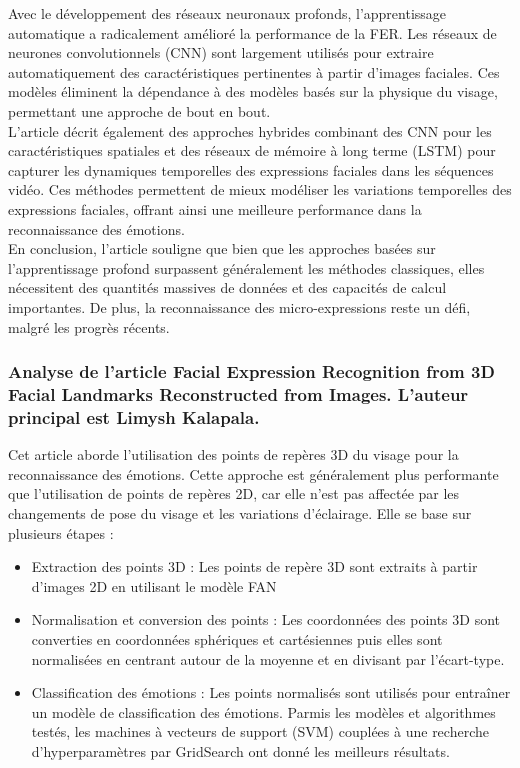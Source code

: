 \documentclass{rapport}
\begin{document}
Avec le développement des réseaux neuronaux profonds, l'apprentissage automatique
a radicalement amélioré la performance de la FER. Les réseaux de neurones convolutionnels
(CNN) sont largement utilisés pour extraire automatiquement des caractéristiques pertinentes
à partir d'images faciales. Ces modèles éliminent la dépendance à des modèles
basés sur la physique du visage, permettant une approche de bout en bout.
\\L'article décrit également des approches hybrides combinant des CNN pour les
caractéristiques spatiales et des réseaux de mémoire à long terme (LSTM) pour
capturer les dynamiques temporelles des expressions faciales dans les séquences vidéo.
Ces méthodes permettent de mieux modéliser les variations temporelles des expressions
faciales, offrant ainsi une meilleure performance dans la reconnaissance des émotions.\\

En conclusion, l'article souligne que bien que les approches basées sur
l'apprentissage profond surpassent généralement les méthodes classiques, elles
nécessitent des quantités massives de données et des capacités de calcul
importantes. De plus, la reconnaissance des micro-expressions reste un défi,
malgré les progrès récents.

\subsubsection{Analyse de l'article \cite{kalapalaFacialExpressionRecognition2020} Facial Expression Recognition from 3D Facial  Landmarks Reconstructed from Images. L'auteur principal est Limysh Kalapala.}

Cet article aborde l'utilisation des points de repères 3D du visage pour la reconnaissance des émotions.
Cette approche est généralement plus performante que l'utilisation de points de repères 2D, car elle n'est pas
affectée par les changements de pose du visage et les variations d'éclairage. Elle se base sur plusieurs étapes :\\
\begin{itemize}
    \item Extraction des points 3D : Les points de repère 3D sont extraits à partir d'images 2D en utilisant le modèle FAN
    \item Normalisation et conversion des points : Les coordonnées des points 3D sont converties en coordonnées sphériques et cartésiennes
          puis elles sont normalisées en centrant autour de la moyenne et en divisant par l'écart-type.
    \item Classification des émotions : Les points normalisés sont utilisés pour entraîner un modèle de classification des émotions. Parmis
          les modèles et algorithmes testés, les machines à vecteurs de support (SVM) couplées à une recherche d'hyperparamètres par GridSearch
          ont donné les meilleurs résultats.\\
\end{itemize}
\end{document}
